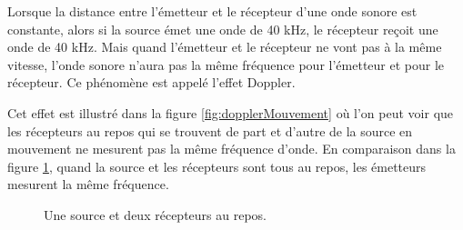 \documentclass[a4paper]{article}
\begin{document}
Lorsque la distance entre l'émetteur et le récepteur d'une onde sonore est constante, alors si la source émet une onde de 40 kHz, le récepteur reçoit une onde de 40 kHz. Mais quand l'émetteur et le récepteur ne vont pas à la même vitesse, l'onde sonore n'aura pas la même fréquence pour l'émetteur et pour le récepteur. Ce phénomène est appelé l'effet Doppler.

Cet effet est illustré dans la figure \ref{fig:dopplerMouvement} où l'on peut voir que les récepteurs au repos qui se trouvent de part et d'autre de la source en mouvement ne mesurent pas la même fréquence d'onde. En comparaison dans la figure \ref{fig:dopplerRepos}, quand la source et les récepteurs sont tous au repos, les émetteurs mesurent la même fréquence.

\begin{center}
    \begin{figure}[H]
        \centering
        \caption{Une source et deux récepteurs au repos.}
        \label{fig:dopplerRepos}
    \end{figure}

    \begin{figure}[H]
        \centering
\end{figure}
\end{center}
\end{document}
